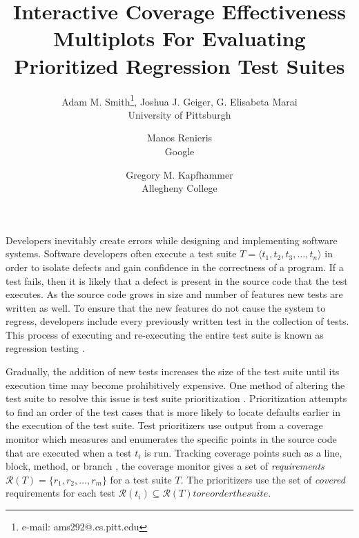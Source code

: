 \documentclass{vgtc}                          %
\title{Interactive Coverage Effectiveness Multiplots For Evaluating \\ Prioritized Regression Test Suites }
\author{Adam M. Smith\thanks{e-mail: ams292@.cs.pitt.edu}, Joshua J. Geiger, G. Elisabeta Marai\\ %
  \scriptsize University of Pittsburgh %
 \and Manos Renieris\\%
     \scriptsize Google %
 \and Gregory M. Kapfhammer\\ %
     \scriptsize Allegheny College}%
\begin{document}



\maketitle



Developers inevitably create errors while designing and implementing software systems.  Software developers often execute a test suite $T = \langle t_1, t_2, t_3,\ldots, t_n\rangle$ in order to isolate defects and gain confidence in the correctness of a program.   If a test fails, then it is likely that a defect is present in the source code that the test executes.  As the source code grows in size and number of features new tests are written as well.  To ensure that the new features do not cause the system to regress, developers include every previously written test in the collection of tests.  This process of executing and re-executing the entire test suite is known as regression testing \cite{rothermelprioritizing2001}.  


Gradually, the addition of new tests increases the size of the test suite until its execution time may become prohibitively expensive.  One method of altering the test suite to resolve this issue is test suite prioritization \cite{rothermelprioritizing2001} \cite{smith:2009}.  Prioritization attempts to find an order of the test cases that is more likely to locate defaults earlier in the execution of the test suite.  
Test prioritizers use output from a coverage monitor which measures and enumerates the specific points in the source code that are executed when a test $t_i$ is run.  Tracking coverage points such as a line, block, method, or branch \cite{zhu}, the coverage monitor gives a set of \textit{requirements} $\mathcal{R}(T) = \{ r_1, r_2,\ldots,r_m \}$ for a test suite $T$.   The prioritizers use the set of \textit{covered} requirements for each test $\mathcal{R}(t_i) \subseteq \mathcal{R}(T) to reorder the suite.$
\end{document}
